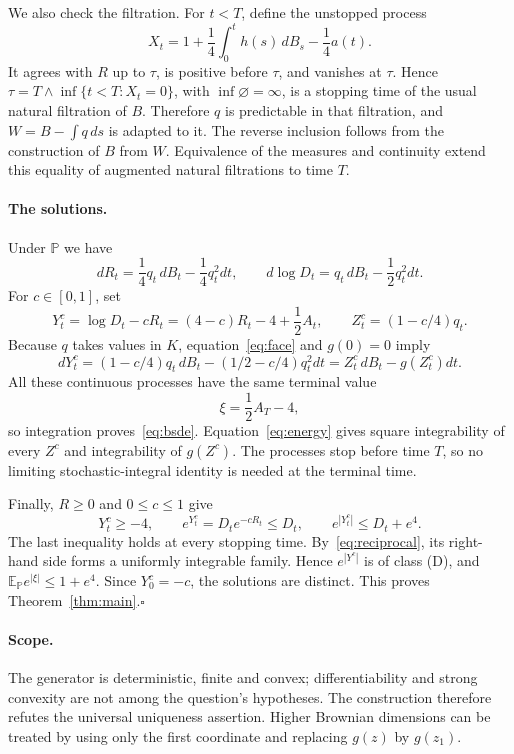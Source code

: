 \documentclass[11pt]{article}
\newcommand{\E}{\mathbb E}
\newcommand{\Pp}{\mathbb P}
\begin{document}
We also check the filtration. For $t<T$, define the unstopped process
\[
 X_t=1+\frac14\int_0^t h(s)\,dB_s-\frac14a(t).
\]
It agrees with $R$ up to $\tau$, is positive before $\tau$, and vanishes at $\tau$. Hence $\tau=T\wedge\inf\{t<T:X_t=0\}$, with $\inf\varnothing=\infty$, is a stopping time of the usual natural filtration of $B$. Therefore $q$ is predictable in that filtration, and $W=B-\int q\,ds$ is adapted to it. The reverse inclusion follows from the construction of $B$ from $W$. Equivalence of the measures and continuity extend this equality of augmented natural filtrations to time $T$.

\paragraph{The solutions.}
Under $\Pp$ we have
\[
 dR_t=\frac14q_t\,dB_t-\frac14q_t^2dt,
 \qquad d\log D_t=q_t\,dB_t-\frac12q_t^2dt.
\]
For $c\in[0,1]$, set
\begin{equation}\label{eq:solutions}
 Y^c_t=\log D_t-cR_t=(4-c)R_t-4+\frac12A_t,
 \qquad Z^c_t=(1-c/4)q_t.
\end{equation}
Because $q$ takes values in $K$, equation~\eqref{eq:face} and $g(0)=0$ imply
\[
 dY^c_t=(1-c/4)q_t\,dB_t-(1/2-c/4)q_t^2dt
       =Z^c_t\,dB_t-g(Z^c_t)dt.
\]
All these continuous processes have the same terminal value
\[
 \xi=\frac12A_T-4,
\]
so integration proves~\eqref{eq:bsde}. Equation~\eqref{eq:energy} gives square integrability of every $Z^c$ and integrability of $g(Z^c)$. The processes stop before time $T$, so no limiting stochastic-integral identity is needed at the terminal time.

Finally, $R\geq0$ and $0\leq c\leq1$ give
\[
 Y^c_t\geq-4,\qquad e^{Y^c_t}=D_te^{-cR_t}\leq D_t,
 \qquad e^{|Y^c_t|}\leq D_t+e^4.
\]
The last inequality holds at every stopping time. By~\eqref{eq:reciprocal}, its right-hand side forms a uniformly integrable family. Hence $e^{|Y^c|}$ is of class (D), and $\E_{\Pp}e^{|\xi|}\leq1+e^4$. Since $Y^c_0=-c$, the solutions are distinct. This proves Theorem~\ref{thm:main}.\hfill$\square$

\paragraph{Scope.}
The generator is deterministic, finite and convex; differentiability and strong convexity are not among the question's hypotheses. The construction therefore refutes the universal uniqueness assertion. Higher Brownian dimensions can be treated by using only the first coordinate and replacing $g(z)$ by $g(z_1)$.
\end{document}

